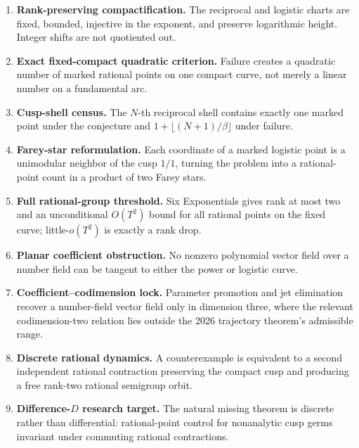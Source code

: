 \documentclass[10pt,oneside]{article}
\theoremstyle{definition}
\theoremstyle{remark}
\begin{document}
\begin{enumerate}[label=\textbf{N\arabic*.}]
\item \textbf{Rank-preserving compactification.}  The reciprocal and logistic charts are fixed, bounded, injective in the exponent, and preserve logarithmic height.  Integer shifts are not quotiented out.
\item \textbf{Exact fixed-compact quadratic criterion.}  Failure creates a quadratic number of marked rational points on one compact curve, not merely a linear number on a fundamental arc.
\item \textbf{Cusp-shell census.}  The \(N\)-th reciprocal shell contains exactly one marked point under the conjecture and \(1+\lfloor(N+1)/\beta\rfloor\) under failure.
\item \textbf{Farey-star reformulation.}  Each coordinate of a marked logistic point is a unimodular neighbor of the cusp \(1/1\), turning the problem into a rational-point count in a product of two Farey stars.
\item \textbf{Full rational-group threshold.}  Six Exponentials gives rank at most two and an unconditional \(O(T^2)\) bound for all rational points on the fixed curve; little-\(o(T^2)\) is exactly a rank drop.
\item \textbf{Planar coefficient obstruction.}  No nonzero polynomial vector field over a number field can be tangent to either the power or logistic curve.
\item \textbf{Coefficient--codimension lock.}  Parameter promotion and jet elimination recover a number-field vector field only in dimension three, where the relevant codimension-two relation lies outside the 2026 trajectory theorem's admissible range.
\item \textbf{Discrete rational dynamics.}  A counterexample is equivalent to a second independent rational contraction preserving the compact cusp and producing a free rank-two rational semigroup orbit.
\item \textbf{Difference-\(D\) research target.}  The natural missing theorem is discrete rather than differential: rational-point control for nonanalytic cusp germs invariant under commuting rational contractions.
\end{enumerate}
\end{document}
